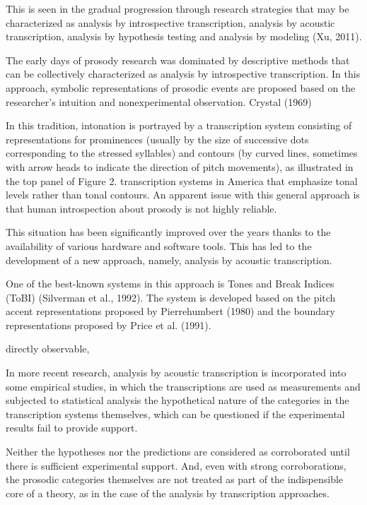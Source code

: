 This is seen in the gradual progression through research strategies that may be characterized as analysis by introspective transcription, analysis by acoustic transcription, analysis by hypothesis testing and analysis by modeling (Xu, 2011). 

The early days of prosody research was dominated by descriptive methods that can be collectively characterized as analysis by introspective transcription. In this approach, symbolic representations of prosodic events are proposed based on the researcher’s intuition and nonexperimental observation. Crystal (1969)

In this tradition, intonation is portrayed by a transcription system consisting of representations for prominences (usually by the size of successive dots corresponding to the stressed syllables) and contours (by curved lines, sometimes with arrow heads to indicate the direction of pitch movements), as illustrated in the top panel of Figure 2. transcription systems in America that emphasize tonal levels rather than tonal contours. An apparent issue with this general approach is that human
introspection about prosody is not highly reliable.

This situation has been significantly improved over the years thanks to the availability of various hardware and software tools. This has led to the development of a new approach, namely, analysis by acoustic transcription.

One of the best-known systems in this approach is Tones and Break Indices (ToBI) (Silverman et al., 1992). The system is developed based on the pitch accent representations proposed by Pierrehumbert (1980) and the boundary representations proposed by Price et al. (1991). 

directly observable, 

In more recent research, analysis by acoustic transcription is incorporated into some empirical studies, in which the transcriptions are used as measurements and subjected to statistical analysis
the hypothetical nature of the categories in the transcription systems themselves, which can be questioned if the experimental results fail to provide support. 

Neither the hypotheses nor the predictions are considered as corroborated until there is sufficient experimental support. And, even with strong corroborations, the prosodic categories themselves are not treated as part of the indispensible core of a theory, as in the case of the analysis by transcription approaches.


